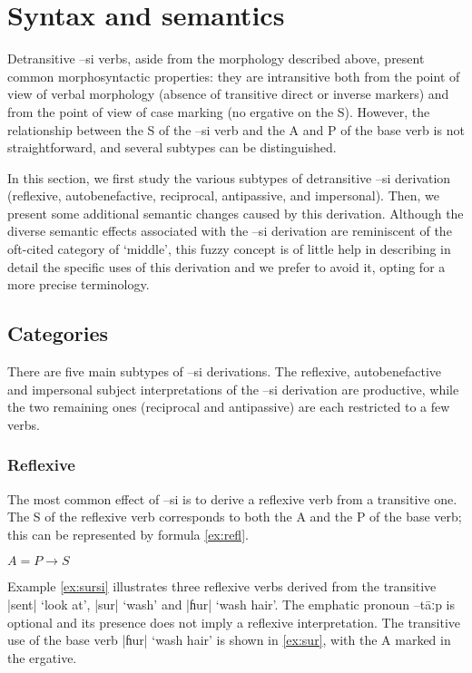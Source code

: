 \documentclass[twoside,a4paper,11pt]{article}
\newcommand{\ipa}[1]{{\phon#1}}
\begin{document}
\section{Syntax and semantics}
Detransitive \ipa{–si}  verbs, aside from the morphology described above, present common morphosyntactic properties: they are intransitive both from the point of view of verbal morphology (absence of transitive direct or inverse markers) and from the point of view of case marking (no ergative on the S). However,  the relationship between the S of the \ipa{–si}  verb and the A and P of the base verb is not straightforward, and several subtypes can be distinguished.

In this section, we first study the various subtypes of detransitive \ipa{--si} derivation (reflexive, autobenefactive, reciprocal, antipassive, and impersonal). Then, we present some additional semantic changes caused by this derivation. Although the diverse semantic effects associated with the \ipa{--si} derivation are reminiscent of the oft-cited category of `middle', this fuzzy concept is of little help in describing in detail  the specific uses of this derivation and we prefer to avoid it, opting for a more precise terminology.

\subsection{Categories} \label{sec:categories}
There are five main subtypes of \ipa{--si} derivations. The reflexive, autobenefactive and impersonal subject interpretations of the \ipa{--si} derivation are productive, while the two remaining ones (reciprocal and antipassive) are each restricted to a few verbs.  


\subsubsection{Reflexive}
The most common effect of \ipa{–si} is to derive a reflexive verb from a transitive one. The S of the reflexive verb corresponds to both the A and the P of the base verb; this  can be represented by  formula \ref{ex:refl}.

\begin{exe}
\ex \label{ex:refl}
\glt $A = P \rightarrow S$
\end{exe}

Example \ref{ex:sursi} illustrates three reflexive verbs derived from the transitive |\ipa{sent}| `look at', |\ipa{sur}| `wash' and |\ipa{ɦur}| `wash hair'. The emphatic pronoun \ipa{--tāːp} is optional and its presence does not  imply a reflexive interpretation. The transitive use of the base verb |\ipa{ɦur}| `wash hair'  is shown in \ref{ex:sur}, with the A marked in the ergative.
\end{document}
